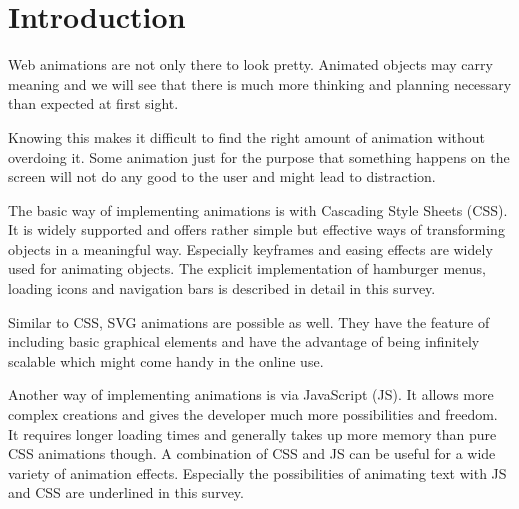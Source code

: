 %
%
% 
% 
% 


\chapter{Introduction}

\label{chap:Intro}

Web animations are not only there to look pretty. Animated objects may carry 
meaning and we will see that there is much more thinking and planning necessary 
than expected at first sight. 

Knowing this makes it difficult to find the right amount of animation without 
overdoing it. Some animation just for the purpose that something happens on the 
screen will not do any good to the user and might lead to distraction. 

The basic way of implementing animations is with Cascading Style Sheets (CSS). 
It is widely supported and offers rather simple but effective ways of 
transforming objects in a meaningful way. Especially keyframes and easing 
effects are widely used for animating objects. 
The explicit implementation of hamburger menus, loading icons and navigation 
bars is described in detail in this survey. 

Similar to CSS, SVG animations are possible as well. They have the feature of 
including basic graphical elements and have the advantage of being infinitely 
scalable which might come handy in the online use. 

Another way of implementing animations is via JavaScript (JS). It allows more 
complex creations and gives the developer much more possibilities and freedom. 
It requires longer loading times and generally takes up more memory than pure 
CSS animations though. A combination of CSS and JS can be useful for a wide 
variety of animation effects. 
Especially the possibilities of animating text with JS and CSS are underlined 
in this survey. 
